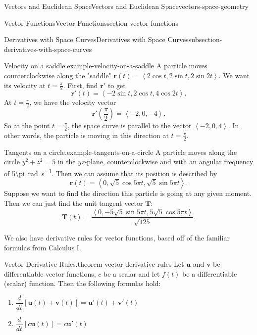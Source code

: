 \documentclass[oneside,10pt,]{book}
\numberwithin{equation}{section}
\newcommand{\vv}[1]{\mathbf{#1}}
\newcommand{\dv}[3][]{\dfrac{d^{#1} #2}{d #3^{#1}}}
\newcommand{\dotprod}[1]{\left\langle #1 \right\rangle}
\begin{document}
\begin{chapterptx}{Vectors and Euclidean Space}{}{Vectors and Euclidean Space}{}{}{vectors-space-geometry}
\begin{sectionptx}{Vector Functions}{}{Vector Functions}{}{}{section-vector-functions}
\begin{subsectionptx}{Derivatives with Space Curves}{}{Derivatives with Space Curves}{}{}{subsection-derivatives-with-space-curves}
\begin{example}{Velocity on a saddle.}{example-velocity-on-a-saddle}
\hypertarget{p-1267}{}%
A particle moves counterclockwise along the "saddle" \(\vv{r}(t) = \dotprod{2\cos t, 2\sin t, 2\sin 2t}\). We want its velocity at \(t=\frac{\pi}{2}\). First, find \(\vv{r}'\) to get%
%
\begin{equation*}
\vv{r}'(t) = \dotprod{-2\sin t,2\cos t,4\cos2t}.
\end{equation*}
\hypertarget{p-1268}{}%
At \(t=\frac{\pi}{2}\), we have the velocity vector%
%
\begin{equation*}
\vv{r}'\left(\frac{\pi}{2}\right) = \dotprod{-2,0,-4}.
\end{equation*}
\hypertarget{p-1269}{}%
So at the point \(t=\frac{\pi}{2}\), the space curve is parallel to the vector \(\dotprod{-2,0,4}\). In other words, the particle is moving in this direction at \(t=\frac{\pi}{2}\).%
\end{example}
\begin{example}{Tangents on a circle.}{example-tangents-on-a-circle}%
\hypertarget{p-1270}{}%
A particle moves along the circle \(y^{2}+z^{2}=5\) in the \(yz\)-plane, counterclockwise and with an angular frequency of \SI{5\pi}{\radian\per\second}. Then we can assume that its position is described by%
%
\begin{equation*}
\vv{r}(t) = \dotprod{0,\sqrt{5}\cos5\pi t, \sqrt{5}\sin5\pi t}.
\end{equation*}
\hypertarget{p-1271}{}%
Suppose we want to find the direction this particle is going at any given moment. Then we can just find the unit tangent vector \(\vv{T}\):%
%
\begin{equation*}
\vv{T}(t) = \frac{\dotprod{0,-5\sqrt{5}\sin5\pi t, 5\sqrt{5}\cos5\pi t}}{\sqrt{125}}.
\end{equation*}
\end{example}
\hypertarget{p-1272}{}%
We also have derivative rules for vector functions, based off of the familiar formulas from Calculus I.%
\begin{theorem}{Vector Derivative Rules.}{}{theorem-vector-derivative-rules}%
\hypertarget{p-1273}{}%
Let \(\vv{u}\) and \(\vv{v}\) be differentiable vector functions, \(c\) be a scalar and let \(f(t)\) be a differentiable (scalar) function. Then the following formulas hold:%
\leavevmode%
\begin{enumerate}
\item\hypertarget{li-128}{}\(\dv{}{t}[\vv{u}(t)+\vv{v}(t)] = \vv{u}'(t)+\vv{v}'(t)\)%
\item\hypertarget{li-129}{}\(\dv{}{t}[c\vv{u}(t)] = c\vv{u}'(t)\)%

\end{enumerate}
\end{theorem}
\end{subsectionptx}
\end{sectionptx}
\end{chapterptx}
\end{document}
